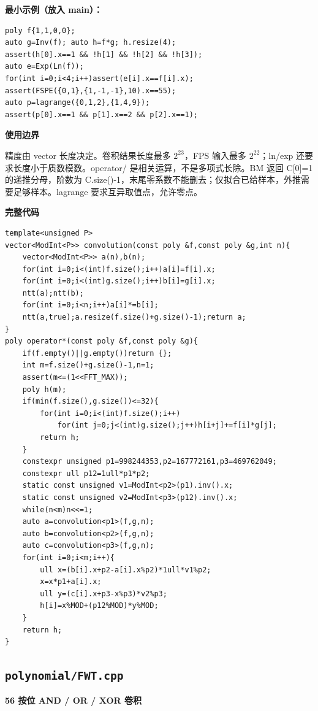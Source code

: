 \documentclass[UTF8,a4paper,10pt]{ctexart}
\newcommand{\TemplNote}[1]{\textbf{使用边界}\par #1\par}
\begin{document}
\textbf{最小示例（放入 main）：}
\begin{lstlisting}
poly f{1,1,0,0};
auto g=Inv(f); auto h=f*g; h.resize(4);
assert(h[0].x==1 && !h[1] && !h[2] && !h[3]);
auto e=Exp(Ln(f));
for(int i=0;i<4;i++)assert(e[i].x==f[i].x);
assert(FSPE({0,1},{1,-1,-1},10).x==55);
auto p=lagrange({0,1,2},{1,4,9});
assert(p[0].x==1 && p[1].x==2 && p[2].x==1);
\end{lstlisting}
\TemplNote{精度由 vector 长度决定。卷积结果长度最多 $2^{23}$，FPS 输入最多 $2^{22}$；ln/exp 还要求长度小于质数模数。operator/ 是相关运算，不是多项式长除。BM 返回 C[0]=1 的递推分母，阶数为 C.size()-1，末尾零系数不能删去；仅拟合已给样本，外推需要足够样本。lagrange 要求互异取值点，允许零点。}
\textbf{完整代码}
\begin{lstlisting}[firstnumber=1]
template<unsigned P>
vector<ModInt<P>> convolution(const poly &f,const poly &g,int n){
	vector<ModInt<P>> a(n),b(n);
	for(int i=0;i<(int)f.size();i++)a[i]=f[i].x;
	for(int i=0;i<(int)g.size();i++)b[i]=g[i].x;
	ntt(a);ntt(b);
	for(int i=0;i<n;i++)a[i]*=b[i];
	ntt(a,true);a.resize(f.size()+g.size()-1);return a;
}
poly operator*(const poly &f,const poly &g){
	if(f.empty()||g.empty())return {};
	int m=f.size()+g.size()-1,n=1;
	assert(m<=(1<<FFT_MAX));
	poly h(m);
	if(min(f.size(),g.size())<=32){
		for(int i=0;i<(int)f.size();i++)
			for(int j=0;j<(int)g.size();j++)h[i+j]+=f[i]*g[j];
		return h;
	}
	constexpr unsigned p1=998244353,p2=167772161,p3=469762049;
	constexpr ull p12=1ull*p1*p2;
	static const unsigned v1=ModInt<p2>(p1).inv().x;
	static const unsigned v2=ModInt<p3>(p12).inv().x;
	while(n<m)n<<=1;
	auto a=convolution<p1>(f,g,n);
	auto b=convolution<p2>(f,g,n);
	auto c=convolution<p3>(f,g,n);
	for(int i=0;i<m;i++){
		ull x=(b[i].x+p2-a[i].x%p2)*1ull*v1%p2;
		x=x*p1+a[i].x;
		ull y=(c[i].x+p3-x%p3)*v2%p3;
		h[i]=x%MOD+(p12%MOD)*y%MOD;
	}
	return h;
}
\end{lstlisting}
\par\vspace{1em}
\subsection{\texttt{polynomial/FWT.cpp}}
\textbf{56 按位 AND / OR / XOR 卷积}
\end{document}
